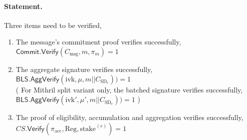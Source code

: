 \documentclass{article}
\newcommand{\m}{\ensuremath{\textrm{msg}}\xspace}
\newcommand{\acc}{\ensuremath{\textrm{acc}}\xspace}
\newcommand{\stake}[1]{\ensuremath{\textrm{stake}_{#1}}\xspace}
\newcommand{\ivk}{\ensuremath{\textrm{ivk}}\xspace}
\newcommand{\BLS}{\ensuremath{\mathsf{BLS}}\xspace}
\newcommand{\Verify}{\ensuremath{\mathsf{Verify}}\xspace}
\newcommand{\AggVerify}{\ensuremath{\mathsf{AggVerify}}\xspace}
\newcommand{\Commit}{\ensuremath{\mathsf{Commit}}\xspace}
\begin{document}
\paragraph{Statement.}

Three items need to be verified,
\begin{enumerate}
    \item The message's commitment proof verifies successfully,\\ $\Commit.\Verify(C_\m, m, \pi_m) = 1$
    \item The aggregate signature verifies successfully,\\ $\BLS.\AggVerify(\ivk, \mu, m || C_{\text{SD}_e})) = 1$\\
    ( For Mithril split variant only, the batched signature verifies successfully,\\ $\BLS.\AggVerify(\ivk', \mu', m || C_{\text{SD}_e})) = 1$ )
    \item The proof of eligibility, accumulation and aggregation verifies successfully,\\ $CS.\Verify(\pi_{\acc}, \text{Reg}, \stake{}^{(e)}) = 1 $
\end{enumerate}
\end{document}
